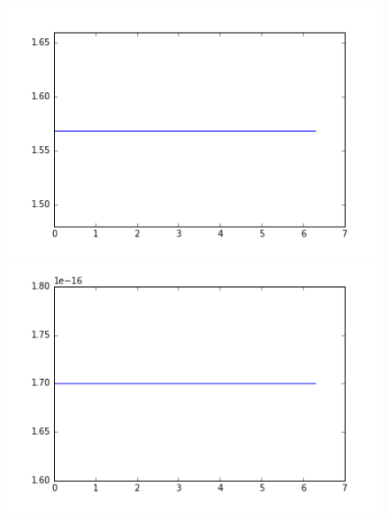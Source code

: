 \documentclass[a4,12pt]{article}
\begin{document}
\begin{figure}[h!]
   \begin{minipage}[c]{.46\linewidth}
      \includegraphics[scale=0.5]{../images/moments/unitDiskMoment2.png} 
   \end{minipage} \hfill
   \begin{minipage}[c]{.46\linewidth}
      \includegraphics[scale=0.5]{../images/moments/unitDiskMoment3.png} 
   \end{minipage}
\end{figure}
\end{document}
